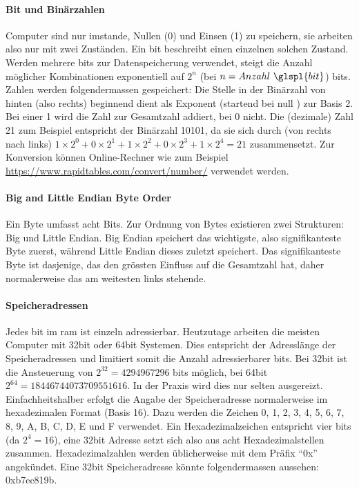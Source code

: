 \documentclass[11pt, a4paper]{article}
\begin{document}
\paragraph{Bit und Binärzahlen}
Computer sind nur imstande, Nullen (0) und Einsen (1) zu speichern, sie arbeiten also nur mit zwei Zuständen. Ein \gls{bit} beschreibt einen einzelnen solchen Zustand. Werden mehrere \glspl{bit} zur Datenspeicherung verwendet, steigt die Anzahl möglicher Kombinationen exponentiell auf \( 2^n \) (bei \(n = Anzahl~\glspl{bit}\)) \glspl{bit}. Zahlen werden folgendermassen gespeichert: Die Stelle in der Binärzahl von hinten (also rechts) beginnend dient als Exponent (startend bei null ) zur Basis 2. Bei einer 1 wird die Zahl zur Gesamtzahl addiert, bei 0 nicht. Die (dezimale) Zahl 21 zum Beispiel entspricht der Binärzahl 10101, da sie sich durch (von rechts nach links) \(1 \times 2^0 + 0 \times 2^1 + 1 \times 2^2 + 0 \times 2^3 + 1 \times 2^4 = 21\) zusammensetzt. Zur Konversion können Online-Rechner wie zum Beispiel \url{https://www.rapidtables.com/convert/number/} verwendet werden.

\paragraph{Big and Little Endian Byte Order}
Ein Byte umfasst acht Bits. Zur Ordnung von Bytes existieren zwei Strukturen: Big und Little Endian. Big Endian speichert das wichtigste, also signifikanteste Byte zuerst, während Little Endian dieses zuletzt speichert. Das signifikanteste Byte ist dasjenige, das den grössten Einfluss auf die Gesamtzahl hat, daher normalerweise das am weitesten links stehende.

\paragraph{Speicheradressen}
Jedes \gls{bit} im \gls{ram} ist einzeln adressierbar. Heutzutage arbeiten die meisten Computer mit 32bit oder 64bit Systemen. Dies entspricht der Adresslänge der Speicheradressen und limitiert somit die Anzahl adressierbarer \glspl{bit}. Bei 32bit ist die Ansteuerung von \(2^{32} = 4 294 967 296\) \glspl{bit} möglich, bei 64bit \(2^{64} = 18 446 744 073 709 551 616\). In der Praxis wird dies nur selten ausgereizt. Einfachheitshalber erfolgt die Angabe der Speicheradresse normalerweise im hexadezimalen Format (Basis 16). Dazu werden die Zeichen 0, 1, 2, 3, 4, 5, 6, 7, 8, 9, A, B, C, D, E und F verwendet. Ein Hexadezimalzeichen entspricht vier \glspl{bit} (da \(2^4 = 16\)), eine 32bit Adresse setzt sich also aus acht Hexadezimalstellen zusammen. Hexadezimalzahlen werden üblicherweise mit dem Präfix ``0x'' angekündet. Eine 32bit Speicheradresse könnte folgendermassen aussehen: 0xb7ec819b. \cite{BitWiki31:online}
\end{document}
